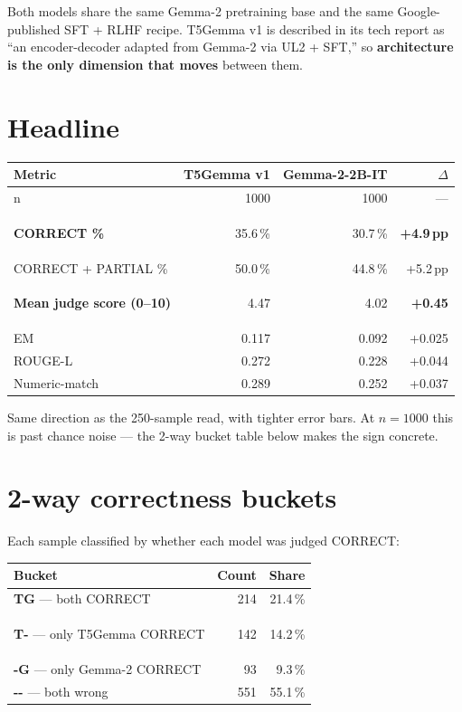 \documentclass[11pt]{article}
\newcommand{\hl}[1]{\colorbox{hilite}{\strut #1}}
\begin{document}
\medskip

Both models share the same Gemma-2 pretraining base and the same
Google-published SFT + RLHF recipe. T5Gemma v1 is described in its tech
report as ``an encoder-decoder adapted from Gemma-2 via UL2 + SFT,'' so
\textbf{architecture is the only dimension that moves} between them.

\section*{Headline}

\begin{tabular}{@{}lrrr@{}}
\toprule
Metric & T5Gemma v1 & Gemma-2-2B-IT & $\Delta$ \\
\midrule
n & 1000 & 1000 & --- \\
\textbf{CORRECT \%} & \hl{35.6\,\%} & 30.7\,\% & \textbf{+4.9\,pp} \\
CORRECT + PARTIAL \% & 50.0\,\% & 44.8\,\% & +5.2\,pp \\
\textbf{Mean judge score (0--10)} & \hl{4.47} & 4.02 & \textbf{+0.45} \\
EM & 0.117 & 0.092 & +0.025 \\
ROUGE-L & 0.272 & 0.228 & +0.044 \\
Numeric-match & 0.289 & 0.252 & +0.037 \\
\bottomrule
\end{tabular}

\medskip

Same direction as the 250-sample read, with tighter error bars. At
$n=1000$ this is past chance noise --- the 2-way bucket table below makes
the sign concrete.

\section*{2-way correctness buckets}

Each sample classified by whether each model was judged CORRECT:

\begin{tabular}{@{}lrr@{}}
\toprule
Bucket & Count & Share \\
\midrule
\textbf{TG} --- both CORRECT & 214 & 21.4\,\% \\
\textbf{T-} --- only T5Gemma CORRECT & \hl{142} & 14.2\,\% \\
\textbf{-G} --- only Gemma-2 CORRECT & 93 & 9.3\,\% \\
\textbf{-{}-} --- both wrong & 551 & 55.1\,\% \\
\bottomrule
\end{tabular}
\end{document}
